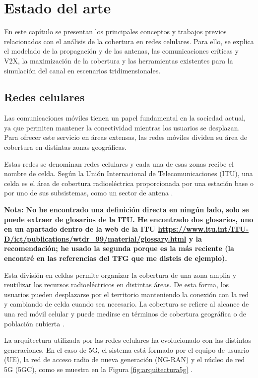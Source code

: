 \chapter{Estado del arte}
\label{chap:estado_arte}

En este capítulo se presentan los principales conceptos y trabajos previos relacionados con el análisis de la cobertura en redes celulares. Para ello, se explica el modelado de la propagación y de las antenas, las comunicaciones críticas y V2X, la maximización de la cobertura y las herramientas existentes para la simulación del canal en escenarios tridimensionales.

\section{Redes celulares}

Las comunicaciones móviles tienen un papel fundamental en la sociedad actual, ya que permiten mantener la conectividad mientras los usuarios se desplazan. Para ofrecer este servicio en áreas extensas, las redes móviles dividen su área de cobertura en distintas zonas geográficas.

Estas redes se denominan redes celulares y cada una de esas zonas recibe el nombre de celda. Según la Unión Internacional de Telecomunicaciones (ITU), una celda es el área de cobertura radioeléctrica proporcionada por una estación base o por uno de sus subsistemas, como un sector de antena \cite{itur_m1224}.

\par\medskip
\textbf{Nota: No he encontrado una definición directa en ningún lado, solo se puede extraer de glosarios de la ITU. He encontrado dos glosarios, uno en un apartado dentro de la web de la ITU \url{https://www.itu.int/ITU-D/ict/publications/wtdr_99/material/glossary.html} y la recomendación; he usado la segunda porque es la más reciente (la encontré en las referencias del TFG que me disteis de ejemplo).}
\par\medskip

Esta división en celdas permite organizar la cobertura de una zona amplia y reutilizar los recursos radioeléctricos en distintas áreas. De esta forma, los usuarios pueden desplazarse por el territorio manteniendo la conexión con la red y cambiando de celda cuando sea necesario. La cobertura se refiere al alcance de una red móvil celular y puede medirse en términos de cobertura geográfica o de población cubierta \cite{itur_m1224}.

La arquitectura utilizada por las redes celulares ha evolucionado con las distintas generaciones. En el caso de 5G, el sistema está formado por el equipo de usuario (UE), la red de acceso radio de nueva generación (NG-RAN) y el núcleo de red 5G (5GC), como se muestra en la Figura \ref{fig:arquitectura5g} \cite{3gpp_5g_overview}.

